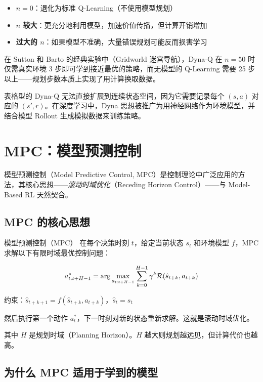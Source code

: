 \begin{itemize}
    \item \textbf{$n = 0$}：退化为标准 Q-Learning（不使用模型规划）
    \item \textbf{$n$ 较大}：更充分地利用模型，加速价值传播，但计算开销增加
    \item \textbf{过大的 $n$}：如果模型不准确，大量错误规划可能反而损害学习
\end{itemize}

在 Sutton 和 Barto 的经典实验中（Gridworld 迷宫导航），Dyna-Q 在 $n = 50$ 时仅需真实环境 3 步即可学到接近最优的策略，而无模型的 Q-Learning 需要 25 步以上——规划步数本质上实现了用计算换取数据。

\begin{remark}
表格型的 Dyna-Q 无法直接扩展到连续状态空间，因为它需要记录每个 $(s,a)$ 对应的 $(s',r)$。在深度学习中，Dyna 思想被推广为用神经网络作为环境模型，并结合模型 Rollout 生成模拟数据来训练策略。
\end{remark}

\section{MPC：模型预测控制}

模型预测控制（Model Predictive Control, MPC）是控制理论中广泛应用的方法，其核心思想——\emph{滚动时域优化}（Receding Horizon Control）——与 Model-Based RL 天然契合。

\subsection{MPC 的核心思想}

\begin{mydefinition}{模型预测控制（MPC）}
在每个决策时刻 $t$，给定当前状态 $s_t$ 和环境模型 $f$，MPC 求解以下有限时域最优控制问题：

\[
a_{t:t+H-1}^* = \arg\max_{a_{t:t+H-1}} \sum_{k=0}^{H-1} \gamma^k \mathcal{R}(\hat{s}_{t+k}, a_{t+k})
\]

约束：$\hat{s}_{t+k+1} = f(\hat{s}_{t+k}, a_{t+k})$，$\hat{s}_t = s_t$

然后执行第一个动作 $a_t^*$，下一时刻对新的状态重新求解。这就是滚动时域优化。
\end{mydefinition}

其中 $H$ 是规划时域（Planning Horizon）。$H$ 越大则规划越远见，但计算代价也越高。

\subsection{为什么 MPC 适用于学到的模型}

